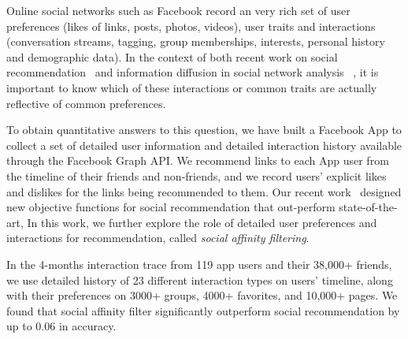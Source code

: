 
\label{sec:introduction}

Online social networks such as Facebook record an very rich set of user
preferences  (likes of links, posts, photos, videos), user traits
and interactions (conversation streams, tagging, group memberships,
interests, personal history and demographic data).  In the context of
both recent work on social recommendation~\cite{sorec,ste,lla} and
information diffusion in social network analysis
~\cite{Goel2012structure,Romero2011hashtag,Bakshy2012chamber}, 
it is important to know which of these interactions or common traits
are actually reflective of common preferences.

To obtain quantitative answers to this question, 
we have built a Facebook App to collect a set of 
detailed user information and detailed interaction history 
available through the Facebook Graph API. 
We recommend links to each App user from the timeline of their 
friends and non-friends, and we record users' explicit likes 
and dislikes for the links being recommended to them. 
Our recent work~\cite{anonymous} designed new objective functions
for social recommendation that out-perform state-of-the-art, 
In this work, we further explore the role of detailed user preferences 
and interactions for recommendation, called {\em social affinity filtering}.

In the 4-months interaction trace from 119 app users and their 38,000+ friends, 
we use detailed history of 23 different interaction types on users' timeline, 
along with their preferences on 3000+ groups, 4000+ favorites, and 10,000+ pages. 
We found that social affinity filter significantly 
outperform social recommendation by up to 0.06 in accuracy.

\cite{Panigrahy2012ubr}
\cite{Goel2012structure}
\cite{Wilson2012BSG}


